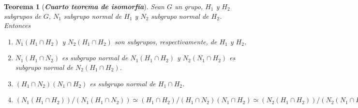 \documentclass[12pt]{article}
\newtheorem{theorem}{Teorema}[section]
\begin{document}
\begin{theorem}[\textbf{\textit{Cuarto teorema de isomorfía}}]
Sean $G$ un grupo, $H_1$ y $H_2$ subgrupos de $G$, $N_1$ subgrupo normal de $H_1$ y $N_2$ subgrupo normal de $H_2$. Entonces 
\begin{enumerate}
\item $N_1(H_1 \cap H_2)$ y $N_2(H_1 \cap H_2)$ son subgrupos, respectivamente, de $H_1$ y $H_2$.
\item $N_1(H_1 \cap N_2)$ es subgrupo normal de $N_1(H_1 \cap H_2)$ y $N_2 (N_1 \cap H_2)$ es subgrupo normal de $N_2(H_1 \cap H_2)$.
\item $(H_1 \cap N_2)(N_1 \cap H_2)$ es subgrupo normal de $H_1 \cap H_2$.
\item $(N_1(H_1 \cap H_2))/(N_1(H_1 \cap N_2)) \simeq (H_1 \cap H_2)/(H_1 \cap N_2)(N_1 \cap H_2) \simeq (N_2(H_1 \cap H_2))/(N_2(N_1 \cap H_2)).$
\end{enumerate}
\end{theorem}
\end{document}
